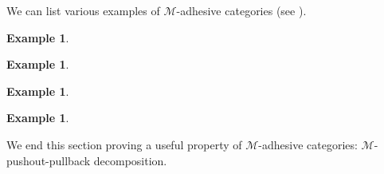 \documentclass[a4paper]{article}
\theoremstyle{definition}
\newtheorem{example}[theorem]{Example}
\begin{document}
We can list various examples of $\mathcal{M}$-adhesive categories (see \cite{castelnovo2023thesis,CastelnovoGM22,lack2006toposes}).

\begin{example}
\end{example}

\begin{example}
\end{example}


\begin{example}
\end{example}

\begin{example}
\end{example}

We end this section proving a useful property of $\mathcal{M}$-adhesive categories:  $\mathcal{M}$-pushout-pullback decomposition.
\end{document}
